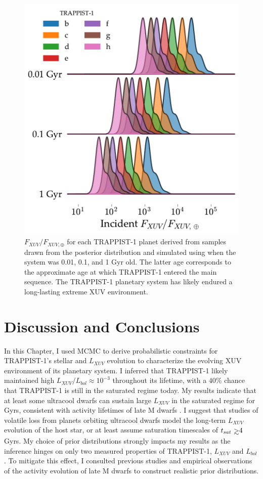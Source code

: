 \begin{figure}
	\includegraphics[width=\textwidth]{fluxes.pdf}
   \caption{$F_{XUV}/F_{XUV,\oplus}$ for each TRAPPIST-1 planet derived from samples drawn from the posterior distribution and simulated using \vplanet when the system was 0.01, 0.1, and 1 Gyr old. The latter age corresponds to the approximate age at which TRAPPIST-1 entered the main sequence. The TRAPPIST-1 planetary system has likely endured a long-lasting extreme XUV environment.}%
    \label{trap:fig:fluxes}%
\end{figure}


\section{Discussion and Conclusions} \label{trap:sec:discussion}

In this Chapter, I used MCMC to derive probabilistic constraints for TRAPPIST-1's stellar and $L_{XUV}$ evolution to characterize the evolving XUV environment of its planetary system. I inferred that TRAPPIST-1 likely maintained high $L_{XUV}/L_{bol} \approx 10^{-3}$ throughout its lifetime, with a $40\%$ chance that TRAPPIST-1 is still in the saturated regime today. My results indicate that at least some ultracool dwarfs can sustain large $L_{XUV}$ in the saturated regime for Gyrs, consistent with activity lifetimes of late M dwarfs \citep{West2008}. I suggest that studies of volatile loss from planets orbiting ultracool dwarfs model the long-term $L_{XUV}$ evolution of the host star, or at least assume saturation timescales of $t_{sat}{\gsim}4$ Gyrs. My choice of prior distributions strongly impacts my results as the inference hinges on only two measured properties of TRAPPIST-1, $L_{XUV}$ and $L_{bol}$. To mitigate this effect, I consulted previous studies and empirical observations of the activity evolution of late M dwarfs to construct realistic prior distributions.

